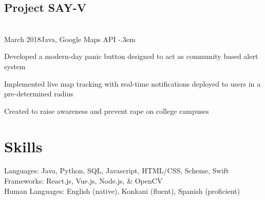 \documentclass{article}
\let\olditemize=\itemize \let\endolditemize=\enditemize
\renewenvironment{itemize}{\olditemize[topsep=0em] \itemsep-.3em}{\endolditemize}
\newcommand{\entry}[3]{\quad\textbf{#1}\\#2\qquad#3}
\begin{document}
	\subsection{Project SAY-V}
	\entry{}{March 2018}{Java, Google Maps API}
	\begin{itemize}
		\item Developed a modern-day panic button designed to act as community based alert system
		\item Implemented live map tracking with real-time notifications deployed to users in a pre-determined radius
		\item Created to raise awareness and prevent rape on college campuses
	\end{itemize}
	
	\section{Skills}
	Languages:
	Java, Python, SQL, Javascript, HTML/CSS, Scheme, Swift \\
	Frameworks:
	React.js, Vue.js, Node.js, \& OpenCV \\
	Human Languages:
	English (native), Konkani (fluent), Spanish (proficient)
	
	
\end{document}

